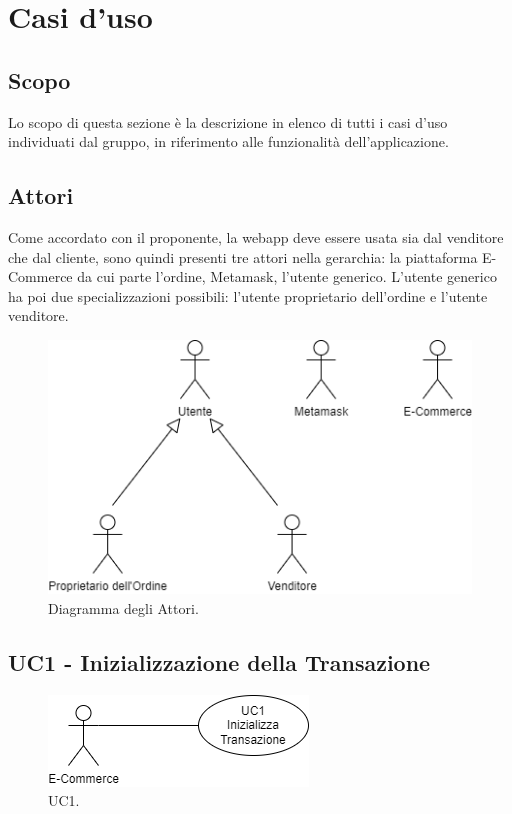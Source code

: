 \section{Casi d'uso} \label{section:casi_uso}

\subsection{Scopo}
Lo scopo di questa sezione è la descrizione in elenco di tutti i casi d'uso individuati dal gruppo, in
riferimento alle funzionalità dell'applicazione.

\subsection{Attori}
Come accordato con il proponente, la webapp deve essere usata sia dal venditore che dal cliente,
sono quindi presenti tre attori nella gerarchia: la piattaforma E-Commerce da cui parte l'ordine, Metamask\glo{}, l'utente generico.
L'utente generico ha poi due specializzazioni possibili: l'utente proprietario dell'ordine e l'utente venditore.

\begin{figure}[H]
    \centering
    \includegraphics[scale=0.7]{immagini/UseCases-Attori.png}
    \caption{Diagramma degli Attori.}
  \end{figure}

\subsection{UC1 - Inizializzazione della Transazione}\label{subsection: UC1}

\begin{figure}[H]
    \centering
    \includegraphics[scale=0.7]{immagini/UseCases-UC1.png}
    \caption{UC1.}
  \end{figure}

